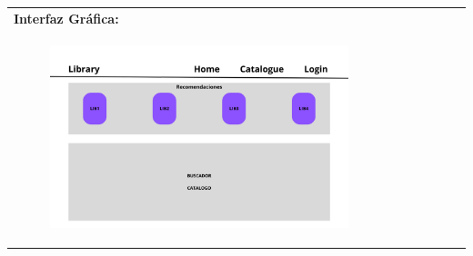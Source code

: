 \documentclass{report}
\begin{document}
\begin{center}
\begin{longtable}{|p{\linewidth}|}
                    \textbf{Interfaz Gráfica:}\\
                    \begin{figure}[H]
                        \centering
                        \includegraphics[width=0.8\textwidth]{./img/grafico/recom_lib.png}
                    \end{figure}\\
                    \hline
                \end{longtable}
            \end{center}
        \clearpage
\end{document}
